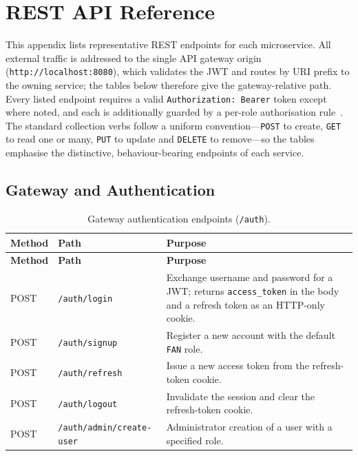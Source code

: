 \chapter{REST API Reference}
\label{app:api}

This appendix lists representative REST endpoints for each microservice. All external
traffic is addressed to the single API gateway origin (\texttt{http://localhost:8080}),
which validates the JWT and routes by URI prefix to the owning service; the tables below
therefore give the gateway-relative path. Every listed endpoint requires a valid
\texttt{Authorization: Bearer} token except where noted, and each is additionally guarded by
a per-role authorisation rule~\cite{rbac,jwt,restapi}. The standard collection verbs follow
a uniform convention---\texttt{POST} to create, \texttt{GET} to read one or many,
\texttt{PUT} to update and \texttt{DELETE} to remove---so the tables emphasise the
distinctive, behaviour-bearing endpoints of each service.

\section{Gateway and Authentication}
\label{app:api-auth}

\begin{longtable}{p{} p{} p{}}
\caption{Gateway authentication endpoints (\texttt{/auth}).}
\label{tab:api-auth}\\
\toprule
\textbf{Method} & \textbf{Path} & \textbf{Purpose} \\
\midrule
\endfirsthead
\toprule
\textbf{Method} & \textbf{Path} & \textbf{Purpose} \\
\midrule
\endhead
\bottomrule
\endlastfoot
POST & \texttt{/auth/login} & Exchange username and password for a JWT; returns \texttt{access\_token} in the body and a refresh token as an HTTP-only cookie. \\
POST & \texttt{/auth/signup} & Register a new account with the default \texttt{FAN} role. \\
POST & \texttt{/auth/refresh} & Issue a new access token from the refresh-token cookie. \\
POST & \texttt{/auth/logout} & Invalidate the session and clear the refresh-token cookie. \\
POST & \texttt{/auth/admin/create-user} & Administrator creation of a user with a specified role. \\
\end{longtable}


